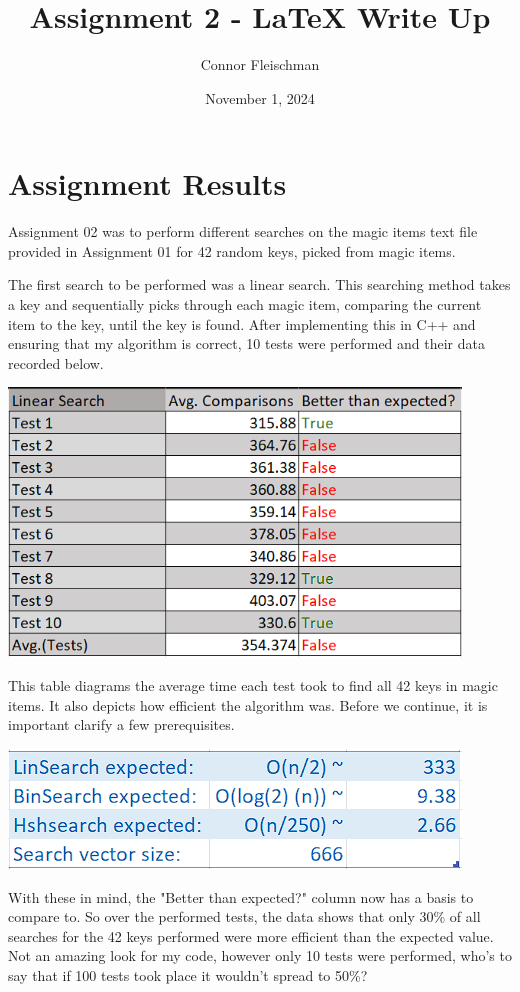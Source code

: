 \documentclass[12pt, letterpaper]{article}
\title{Assignment 2 - LaTeX Write Up}
\author{Connor Fleischman}
\date{November 1, 2024}
\begin{document}
\maketitle

\section{Assignment Results} \label{AssignmentResult}
Assignment 02 was to perform different searches on the magic items text file provided in Assignment 01 for 42 random keys, picked from magic items.

The first search to be performed was a linear search.
This searching method takes a key and sequentially picks through each magic item, comparing the current item to the key, until the key is found.
After implementing this in C++ and ensuring that my algorithm is correct, 10 tests were performed and their data recorded below.
\begin{center}
   \includegraphics[width=120mm,scale=0.5]{LinSearch.png}
\end{center}
This table diagrams the average time each test took to find all 42 keys in magic items. 
It also depicts how efficient the algorithm was.
Before we continue, it is important clarify a few prerequisites.
\begin{center}
   \includegraphics[width=120mm,scale=0.5]{Prerequisites.png}
\end{center}
With these in mind, the "Better than expected?" column now has a basis to compare to.
So over the performed tests, the data shows that only 30\% of all searches for the 42 keys performed were more efficient than the expected value.
Not an amazing look for my code, however only 10 tests were performed, who's to say that if 100 tests took place it wouldn't spread to 50\%?
\end{document}
